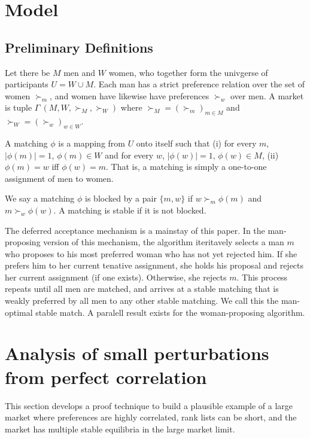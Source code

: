 \documentclass[WP]{AEA}
\begin{document}
\section{Model}
\subsection{Preliminary Definitions}

Let there be $M$ men and $W$ women, who together form the univgerse of participants $U = W \cup M$.  Each man has a strict preference relation over the set of women $\succ_{m}$, and women have likewise have preferences $\succ_w$ over men. A market is tuple $\Gamma \ (M,W, \succ_{M}, \succ_W)$ where $\succ_{M} = (\succ_{m})_{m \in M}$ and $\succ_W = (\succ_w)_{w \in W}$.

A matching $\phi$ is a mapping from $U$ onto itself such that (i) for every $m$, $|\phi(m)| = 1$, $\phi(m) \in W$ and for every  $w$, $|\phi(w)| = 1$, $\phi(w) \in M$, (ii) $\phi(m) = w$ iff $\phi(w) = m$.  That is, a matching is simply a one-to-one assignment of men to women.

We say a matching $\phi$ is blocked by a pair $\{m,w\}$ if $w \succ_m \phi(m)$ and $m \succ_w \phi(w)$.  A matching is stable if it is not blocked.

The deferred acceptance mechanism is a mainstay of this paper. In the man-proposing version of this mechanism, the algorithm iteritavely selects a man $m$ who proposes to his most preferred woman who has not yet rejected him.  If she prefers him to her current tenative assignment, she holds his proposal and rejects her current assignment (if one exists). Otherwise, she rejects $m$.  This process repeats until all men are matched, and arrives at a stable matching that is weakly preferred by all men to any other stable matching.  We call this the man-optimal stable match.  A paralell result exists for the woman-proposing algorithm.

\section{Analysis of small perturbations from perfect correlation}  \label{sect:counterexample}
This section develops a proof technique to build a plausible example of a large market where preferences are highly correlated, rank lists can be short, and the market has multiple stable equilibria in the large market limit. 
\end{document}
